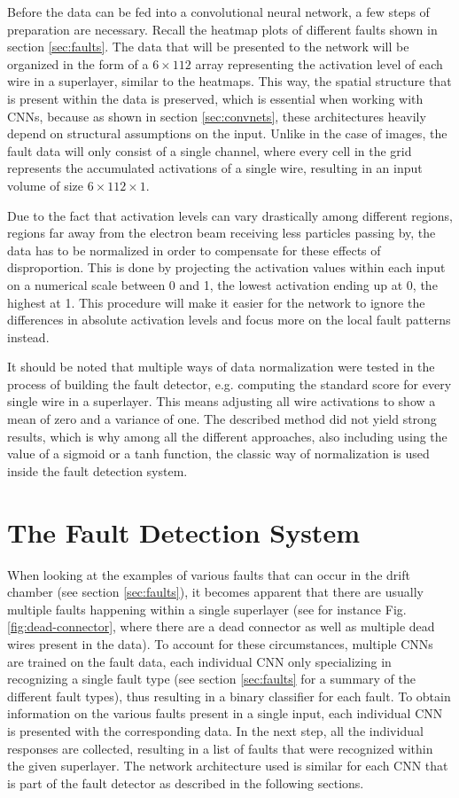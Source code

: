 Before the data can be fed into a convolutional neural network, a few
steps of preparation are necessary. Recall the heatmap plots of
different faults shown in section \ref{sec:faults}. The data that will
be presented to the network will be organized in the form of a \(6
\times 112\) array representing the activation level of each wire in a
superlayer, similar to the heatmaps. This way, the spatial structure
that is present within the data is preserved, which is essential when
working with CNNs, because as shown in section \ref{sec:convnets},
these architectures heavily depend on structural assumptions on the
input. Unlike in the case of images, the fault data will only consist
of a single channel, where every cell in the grid represents the
accumulated activations of a single wire, resulting in an input volume
of size \(6 \times 112 \times 1\).

Due to the fact that activation levels can vary drastically among
different regions, regions far away from the electron beam receiving
less particles passing by, the data has to be normalized in order to
compensate for these effects of disproportion. This is done by projecting
the activation values within each input on a numerical scale between 0
and 1, the lowest activation ending up at 0, the highest at 1. This
procedure will make it easier for the network to ignore the
differences in absolute activation levels and focus more on the local
fault patterns instead.

It should be noted that multiple ways of data normalization
were tested in the process of building the fault detector, e.g. computing
the standard score for every single wire in a superlayer.
This means adjusting all wire activations to show a mean of zero and a
variance of one. The described method did not yield strong results,
which is why among all the different approaches, also including
using the value of a sigmoid or a tanh function, the classic way of
normalization is used inside the fault detection system.

\section{The Fault Detection System}

When looking at the examples of various faults that can occur in the
drift chamber (see section \ref{sec:faults}), it becomes apparent that
there are usually multiple faults happening within a single
superlayer (see for instance Fig. \ref{fig:dead-connector}, where
there are a dead connector as well as multiple dead wires present in
the data). To account for these circumstances, multiple CNNs are
trained on the fault data, each individual CNN only specializing in
recognizing a single fault type (see section \ref{sec:faults} for a
summary of the different fault types), thus
resulting in a binary classifier for each fault. To obtain information
on the various faults present in a single input, each individual CNN
is presented with the corresponding data. In the next step, all the
individual responses are collected, resulting in a list of faults that
were recognized within the given superlayer. The network architecture
used is similar for each CNN that is part of the fault detector as
described in the following sections.

